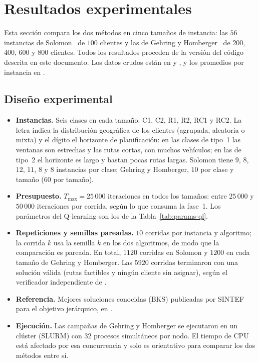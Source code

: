 \section{Resultados experimentales}
\label{sec:experimentos}

Esta sección compara los dos métodos en cinco tamaños de instancia: las $56$ instancias de
Solomon~\cite{solomon1987} de $100$ clientes y las de Gehring y Homberger~\cite{gehring1999}
de $200$, $400$, $600$ y $800$ clientes. Todos los resultados proceden de la versión del
código descrita en este documento. Los datos crudos están en
 y , y los promedios
por instancia en .

\subsection{Diseño experimental}
\label{sec:exp-diseno}

\begin{itemize}
\item \textbf{Instancias.} Seis clases en cada tamaño: C1, C2, R1, R2, RC1 y RC2. La letra
indica la distribución geográfica de los clientes (agrupada, aleatoria o mixta) y el dígito el
horizonte de planificación: en las clases de tipo~1 las ventanas son estrechas y las rutas
cortas, con muchos vehículos; en las de tipo~2 el horizonte es largo y bastan pocas rutas
largas. Solomon tiene $9$, $8$, $12$, $11$, $8$ y $8$ instancias por clase; Gehring y
Homberger, $10$ por clase y tamaño ($60$ por tamaño).
\item \textbf{Presupuesto.} $T_{\max}=25\,000$ iteraciones en todos los tamaños: entre
$25\,000$ y $50\,000$ iteraciones por corrida, según lo que consuma la fase~1. Los parámetros
del Q-learning son los de la Tabla~\ref{tab:params-ql}.
\item \textbf{Repeticiones y semillas pareadas.} $10$ corridas por instancia y algoritmo; la
corrida $k$ usa la semilla $k$ en los dos algoritmos, de modo que la comparación es pareada.
En total, $1120$ corridas en Solomon y $1200$ en cada tamaño de Gehring y Homberger. Las
$5920$ corridas terminaron con una solución válida (rutas factibles y ningún cliente sin
asignar), según el verificador independiente de .
\item \textbf{Referencia.} Mejores soluciones conocidas (BKS) publicadas por SINTEF para el
objetivo jerárquico, en .
\item \textbf{Ejecución.} Las campañas de Gehring y Homberger se ejecutaron en un clúster
(SLURM) con $32$ procesos simultáneos por nodo. El tiempo de CPU está afectado por esa
concurrencia y solo es orientativo para comparar los dos métodos entre sí.
\end{itemize}

